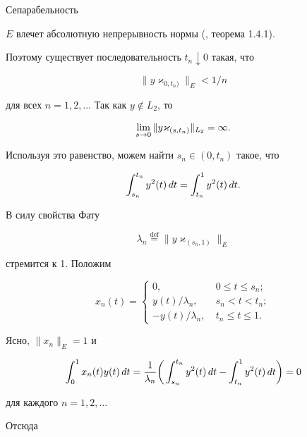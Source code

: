 Сепарабельность


$E$ влечет абсолютную непрерывность нормы (\cite{BS}, теорема 1.4.1). 


Поэтому существует последовательность $t_n \downarrow 0$ такая, что


$$


\|y \varkappa_{0, t_n)} \|_E < 1/ n 


$$


для всех $n=1,2, \dotsc$ Так как $y \notin L_2$, то


$$


\liml{s\to 0} \|y \varkappa_{(s, t_n)} \|_{L_2} = \infty.


$$


Используя это равенство, можем найти $s_n \in (0, t_n)$ такое, что 


$$


\intl{s_n}{t_n} y^2 (t)\, dt = \intl{t_n} {1} y^2 (t)\, dt.


$$


В силу свойства Фату


$$


\lambda_n \overset{\mathrm{def}}{=}{} \| y \varkappa_{(s_n, 1)}\|_E


$$


стремится к 1. Положим


$$


x_n (t) =


\begin{cases}


0, & 0\le t \le s_n; \\


y(t) / \lambda _n, & s_n < t < t_n; \\


- y(t) / \lambda _n , \ & t_n \le t \le 1. 


\end{cases}


$$


Ясно, $\|x_n\| _E=1$ и


$$


\intl{0}{1} x_n (t) y(t)\, dt = \frac 1 {\lambda_n} \bigg(


\intl{s_n}{t_n} y^2 (t)\, dt -\intl{t_n}{1} y^2 (t)\, dt \bigg) =0


$$


для каждого $n=1,2, \dotsc$


Отсюда


